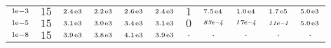 \begin{tiny}
\begin{tabular}{@{$\;$}c@{$\;$}|@{$\;$}c@{$\;$}@{$\;$}c@{$\;$}@{$\;$}c@{$\;$}@{$\;$}c@{$\;$}@{$\;$}c@{$\;$}|@{$\;$}c@{$\;$}@{$\;$}c@{$\;$}@{$\;$}c@{$\;$}@{$\;$}c@{$\;$}@{$\;$}c@{$\;$}}
$\scriptstyle1\!\mathrm{\hspace{0.10em}e}-3$ & $\scriptstyle15$ & $\scriptstyle2.4\mathrm{\hspace{0.10em}e}3$ & $\scriptstyle2.2\mathrm{\hspace{0.10em}e}3$ & $\scriptstyle2.6\mathrm{\hspace{0.10em}e}3$ & $\scriptstyle2.4\mathrm{\hspace{0.10em}e}3$ & $\scriptstyle1$ & $\scriptstyle7.5\mathrm{\hspace{0.10em}e}4$ & $\scriptstyle1.0\mathrm{\hspace{0.10em}e}4$ & $\scriptstyle1.7\mathrm{\hspace{0.10em}e}5$ & $\scriptstyle5.0\mathrm{\hspace{0.10em}e}3$\\ 
$\scriptstyle1\!\mathrm{\hspace{0.10em}e}-5$ & $\scriptstyle15$ & $\scriptstyle3.1\mathrm{\hspace{0.10em}e}3$ & $\scriptstyle3.0\mathrm{\hspace{0.10em}e}3$ & $\scriptstyle3.4\mathrm{\hspace{0.10em}e}3$ & $\scriptstyle3.1\mathrm{\hspace{0.10em}e}3$ & $\scriptstyle0$ & $\scriptstyle\textit{83}\hspace{0.00em}e\textit{--4}$ & $\scriptstyle\textit{17}\hspace{0.00em}e\textit{--4}$ & $\scriptstyle\textit{11}\hspace{0.00em}e\textit{--1}$ & $\scriptstyle5.0\mathrm{\hspace{0.10em}e}3$\\ 
$\scriptstyle1\!\mathrm{\hspace{0.10em}e}-8$ & $\scriptstyle15$ & $\scriptstyle3.9\mathrm{\hspace{0.10em}e}3$ & $\scriptstyle3.8\mathrm{\hspace{0.10em}e}3$ & $\scriptstyle4.1\mathrm{\hspace{0.10em}e}3$ & $\scriptstyle3.9\mathrm{\hspace{0.10em}e}3$ & $\scriptstyle.$ & $\scriptstyle.$ & $\scriptstyle.$ & $\scriptstyle.$ & $\scriptstyle.$\\ 
\end{tabular} 
\end{tiny} 
